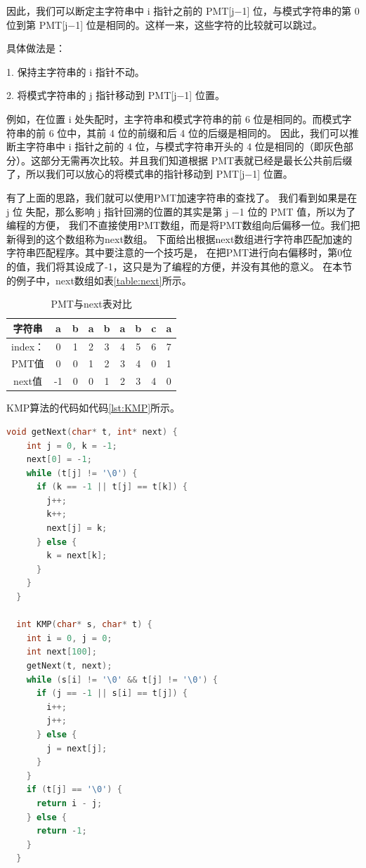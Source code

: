 \documentclass[lang=cn,newtx,10pt,scheme=chinese]{../elegantbook}
\begin{document}
因此，我们可以断定主字符串中 i 指针之前的 PMT[j−1] 位，与模式字符串的第 0 位到第 PMT[j−1] 位是相同的。这样一来，这些字符的比较就可以跳过。

具体做法是：

1. 保持主字符串的 i 指针不动。

2. 将模式字符串的 j 指针移动到 PMT[j−1] 位置。

例如，在位置 i 处失配时，主字符串和模式字符串的前 6 位是相同的。而模式字符串的前 6 位中，其前 4 位的前缀和后 4 位的后缀是相同的。
因此，我们可以推断主字符串中 i 指针之前的 4 位，与模式字符串开头的 4 位是相同的（即灰色部分）。这部分无需再次比较。并且我们知道根据
PMT表就已经是最长公共前后缀了，所以我们可以放心的将模式串的指针移动到 PMT[j−1] 位置。

有了上面的思路，我们就可以使用PMT加速字符串的查找了。
我们看到如果是在 j 位 失配，那么影响 j 指针回溯的位置的其实是第 j −1 位的 PMT 值，所以为了编程的方便， 
我们不直接使用PMT数组，而是将PMT数组向后偏移一位。我们把新得到的这个数组称为next数组。
下面给出根据next数组进行字符串匹配加速的字符串匹配程序。其中要注意的一个技巧是，
在把PMT进行向右偏移时，第0位的值，我们将其设成了-1，这只是为了编程的方便，并没有其他的意义。
在本节的例子中，next数组如表\ref{table:next}所示。


\begin{table}[htbp]
  \centering
  \caption{PMT与next表对比}
  \begin{tabular}{|c|c|c|c|c|c|c|c|c|}
    \hline
    字符串 & a & b & a & b & a & b & c & a \\
    \hline
    index： & 0 & 1 & 2 & 3 & 4 & 5 & 6 & 7 \\
    \hline
    PMT值 & 0 & 0 & 1 & 2 & 3 & 4 & 0 & 1 \\
    \hline
    next值 & -1 & 0 & 0 & 1 & 2 & 3 & 4 & 0 \\
    \hline
  \end{tabular}
  \label{table:next-PMT}
\end{table}

KMP算法的代码如代码\ref{lst:KMP}所示。

\begin{lstlisting}[language=C++, caption={KMP算法示例代码}, label={lst:KMP}]
  void getNext(char* t, int* next) {
    int j = 0, k = -1;
    next[0] = -1;
    while (t[j] != '\0') {
      if (k == -1 || t[j] == t[k]) {
        j++;
        k++;
        next[j] = k;
      } else {
        k = next[k];
      }
    }
  }

  int KMP(char* s, char* t) {
    int i = 0, j = 0;
    int next[100];
    getNext(t, next);
    while (s[i] != '\0' && t[j] != '\0') {
      if (j == -1 || s[i] == t[j]) {
        i++;
        j++;
      } else {
        j = next[j];
      }
    }
    if (t[j] == '\0') {
      return i - j;
    } else {
      return -1;
    }
  }

\end{lstlisting}
\end{document}
